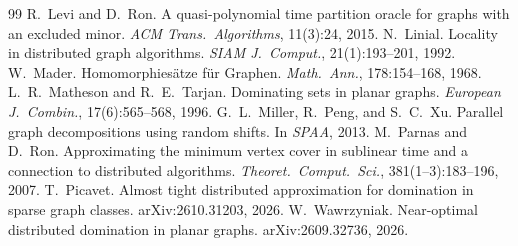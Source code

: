 \documentclass[11pt]{article}
\theoremstyle{remark}
\begin{document}
\begin{thebibliography}{99}
 R.~Levi and D.~Ron. A quasi-polynomial time partition oracle for graphs with an
  excluded minor. \emph{ACM Trans.\ Algorithms}, 11(3):24, 2015.
 N.~Linial. Locality in distributed graph algorithms. \emph{SIAM J.\ Comput.},
  21(1):193--201, 1992.
 W.~Mader. Homomorphies\"atze f\"ur Graphen. \emph{Math.\ Ann.}, 178:154--168, 1968.
 L.~R.~Matheson and R.~E.~Tarjan. Dominating sets in planar graphs. \emph{European
  J.\ Combin.}, 17(6):565--568, 1996.
 G.~L.~Miller, R.~Peng, and S.~C.~Xu. Parallel graph decompositions using random shifts. In
  \emph{SPAA}, 2013.
 M.~Parnas and D.~Ron. Approximating the minimum vertex cover in sublinear time and a
  connection to distributed algorithms. \emph{Theoret.\ Comput.\ Sci.}, 381(1--3):183--196, 2007.
 T.~Picavet. Almost tight distributed approximation for domination in sparse graph
  classes. arXiv:2610.31203, 2026.
 W.~Wawrzyniak. Near-optimal distributed domination in planar graphs.
  arXiv:2609.32736, 2026.
\end{thebibliography}
\end{document}
